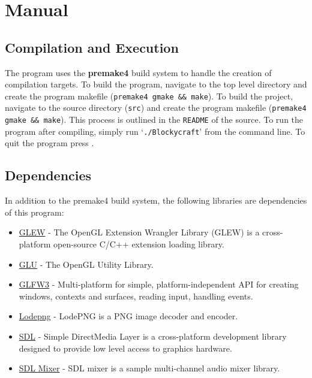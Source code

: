 \documentclass[a4paper,11pt,titlepage]{scrartcl}
\begin{document}

\section{Manual}
\subsection{Compilation and Execution}
The program uses the \textbf{premake4} build system to handle the creation of compilation targets. To build the program, navigate to the top level directory and create the program makefile (\texttt{premake4 gmake \&\& make}). To build the project, navigate to the source directory (\texttt{src}) and create the program makefile (\texttt{premake4 gmake \&\& make}).
This process is outlined in the \texttt{README} of the source. To run the program after compiling, simply run `\texttt{./Blockycraft}' from the command line. To quit the program press .

\subsection{Dependencies}
In addition to the premake4 build system, the following libraries are dependencies of this program: 
\begin{itemize}
	\item \href{https://github.com/nigels-com/glew}{GLEW} - The OpenGL Extension Wrangler Library (GLEW) is a cross-platform open-source C/C++ extension loading library.
	\item \href{https://www.opengl.org/resources/libraries/}{GLU} - The OpenGL Utility Library.
	\item \href{http://www.glfw.org/docs/latest/}{GLFW3} - Multi-platform for simple, platform-independent API for creating windows, contexts and surfaces, reading input, handling events.
	\item \href{http://lodev.org/lodepng/}{Lodepng} - LodePNG is a PNG image decoder and encoder.
	\item \href{https://www.libsdl.org/}{SDL} - Simple DirectMedia Layer is a cross-platform development library designed to provide low level access to graphics hardware.
	\item \href{https://www.libsdl.org/projects/SDL_mixer/}{SDL Mixer} - SDL mixer is a sample multi-channel audio mixer library. 
\end{itemize}
\end{document}

